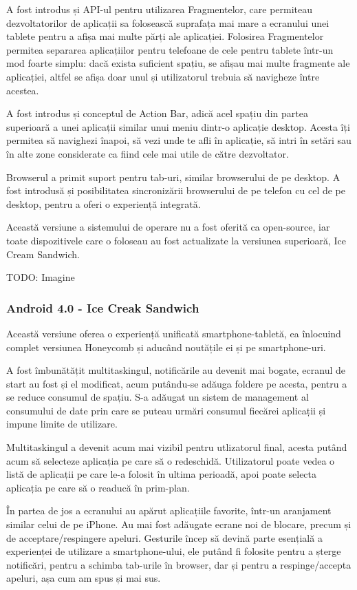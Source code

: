 \documentclass[12pt,a4paper]{article}
\begin{document}
	A fost introdus și API-ul pentru utilizarea Fragmentelor, care permiteau dezvoltatorilor de aplicații sa folosească suprafața mai mare a ecranului unei tablete pentru a afișa mai multe părți ale aplicației. Folosirea Fragmentelor permitea separarea aplicațiilor pentru telefoane de cele pentru tablete într-un mod foarte simplu: dacă exista suficient spațiu, se afișau mai multe fragmente ale aplicației, altfel se afișa doar unul și utilizatorul trebuia să navigheze între acestea.

	A fost introdus și conceptul de Action Bar, adică acel spațiu din partea superioară a unei aplicații similar unui meniu dintr-o aplicație desktop. Acesta îți permitea să navighezi înapoi, să vezi unde te afli în aplicație, să intri în setări sau în alte zone considerate ca fiind cele mai utile de către dezvoltator.

	Browserul a primit suport pentru tab-uri, similar browserului de pe desktop. A fost introdusă și posibilitatea sincronizării browserului de pe telefon cu cel de pe desktop, pentru a oferi o experiență integrată.

	Această versiune a sistemului de operare nu a fost oferită ca open-source, iar toate dispozitivele care o foloseau au fost actualizate la versiunea superioară, Ice Cream Sandwich.

	TODO: Imagine

\subsubsection{Android 4.0 - Ice Creak Sandwich}
Această versiune oferea o experiență unificată smartphone-tabletă, ea înlocuind complet versiunea Honeycomb și aducând noutățile ei și pe smartphone-uri.

	A fost îmbunătățit multitaskingul, notificările au devenit mai bogate, ecranul de start au fost și el modificat, acum putându-se adăuga foldere pe acesta, pentru a se reduce consumul de spațiu. S-a adăugat un sistem de management al consumului de date prin care se puteau urmări consumul fiecărei aplicații și impune limite de utilizare.

	Multitaskingul a devenit acum mai vizibil pentru utlizatorul final, acesta putând acum să selecteze aplicația pe care să o redeschidă. Utilizatorul poate vedea o listă de aplicații pe care le-a folosit în ultima perioadă, apoi poate selecta aplicația pe care să o readucă în prim-plan.

	În partea de jos a ecranului au apărut aplicațiile favorite, într-un aranjament similar celui de pe iPhone. Au mai fost adăugate ecrane noi de blocare, precum și de acceptare/respingere apeluri. Gesturile încep să devină parte esențială a experienței de utilizare a smartphone-ului, ele putând fi folosite pentru a șterge notificări, pentru a schimba tab-urile în browser, dar și pentru a respinge/accepta apeluri, așa cum am spus și mai sus.
\end{document}
